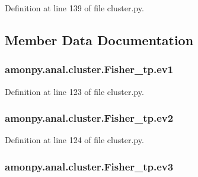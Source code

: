 Definition at line 139 of file cluster.\-py.



\subsection{Member Data Documentation}
\hypertarget{classamonpy_1_1anal_1_1cluster_1_1_fisher__tp_a4b282e58dde2fdfc1c815e6f6d2fba5f}{
\subsubsection[{ev1}]{\setlength{\rightskip}{0pt plus 5cm}amonpy.\-anal.\-cluster.\-Fisher\-\_\-tp.\-ev1}}\label{classamonpy_1_1anal_1_1cluster_1_1_fisher__tp_a4b282e58dde2fdfc1c815e6f6d2fba5f}


Definition at line 123 of file cluster.\-py.

\hypertarget{classamonpy_1_1anal_1_1cluster_1_1_fisher__tp_a5aad4ba062a0103b45387fea062e00f9}{
\subsubsection[{ev2}]{\setlength{\rightskip}{0pt plus 5cm}amonpy.\-anal.\-cluster.\-Fisher\-\_\-tp.\-ev2}}\label{classamonpy_1_1anal_1_1cluster_1_1_fisher__tp_a5aad4ba062a0103b45387fea062e00f9}


Definition at line 124 of file cluster.\-py.

\hypertarget{classamonpy_1_1anal_1_1cluster_1_1_fisher__tp_a222ee1411c4db3f384af8421292f2ec1}{
\subsubsection[{ev3}]{\setlength{\rightskip}{0pt plus 5cm}amonpy.\-anal.\-cluster.\-Fisher\-\_\-tp.\-ev3}}\label{classamonpy_1_1anal_1_1cluster_1_1_fisher__tp_a222ee1411c4db3f384af8421292f2ec1}



